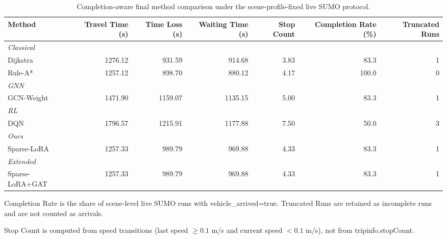 
\begin{table}[t]
\centering
\caption{Completion-aware final method comparison under the scene-profile-fixed live SUMO protocol.}
\label{tab:table1_method_comparison_final}
\small
\begin{threeparttable}
\begin{tabular}{lrrrrrr}
\toprule
Method & Travel Time (s) & Time Loss (s) & Waiting Time (s) & Stop Count & Completion Rate (\%) & Truncated Runs \\
\midrule
\multicolumn{7}{l}{\textit{Classical}} \\
Dijkstra & 1276.12 & 931.59 & 914.68 & 3.83 & 83.3 & 1 \\
Rule-A* & 1257.12 & 898.70 & 880.12 & 4.17 & 100.0 & 0 \\
\midrule
\multicolumn{7}{l}{\textit{GNN}} \\
GCN-Weight & 1471.90 & 1159.07 & 1135.15 & 5.00 & 83.3 & 1 \\
\midrule
\multicolumn{7}{l}{\textit{RL}} \\
DQN & 1796.57 & 1215.91 & 1177.88 & 7.50 & 50.0 & 3 \\
\midrule
\multicolumn{7}{l}{\textit{Ours}} \\
Sparse-LoRA & 1257.33 & 989.79 & 969.88 & 4.33 & 83.3 & 1 \\
\midrule
\multicolumn{7}{l}{\textit{Extended}} \\
Sparse-LoRA+GAT & 1257.33 & 989.79 & 969.88 & 4.33 & 83.3 & 1 \\
\bottomrule
\end{tabular}
\begin{tablenotes}[flushleft]
\footnotesize
\item Completion Rate is the share of scene-level live SUMO runs with vehicle\_arrived=true. Truncated Runs are retained as incomplete runs and are not counted as arrivals.
\item Stop Count is computed from speed transitions (last speed $\geq 0.1$ m/s and current speed $< 0.1$ m/s), not from tripinfo.stopCount.
\end{tablenotes}
\end{threeparttable}
\end{table}
